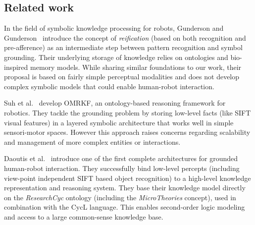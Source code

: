 \documentclass{svmult}
\newcommand{\eg}{{\textit{e.g.~}}}
\begin{document}
% 
% 


\subsection{Related work}

In the field of symbolic knowledge processing for robots, Gunderson and
Gunderson~\cite{Gunderson2008} introduce the concept of \emph{reification}
(based on both recognition and pre-afference) as an intermediate step between
pattern recognition and symbol grounding. Their underlying storage of knowledge
relies on ontologies and bio-inspired memory models. While sharing similar
foundations to our work, their proposal is based on fairly simple perceptual
modalities and does not develop complex symbolic models that could enable
human-robot interaction.

Suh et al.~\cite{Suh2007} develop {\sc OMRKF}, an ontology-based reasoning
framework for robotics. They tackle the grounding problem by storing low-level
facts (like SIFT visual features) in a layered symbolic architecture that works
well in simple sensori-motor spaces. However this approach raises concerns
regarding scalability and management of more complex entities or interactions.

Daoutis et al.~\cite{Daoutis2009} introduce one of the first complete
architectures for grounded human-robot interaction. They successfully bind
low-level percepts (including view-point independent SIFT based object
recognition) to a high-level knowledge representation and reasoning system.
They base their knowledge model directly on the \textit{ResearchCyc} ontology
(including the \textit{MicroTheories} concept), used in combination with the
{\sc CycL} language. This enables second-order logic modeling and access to a
large common-sense knowledge base.
\end{document}
